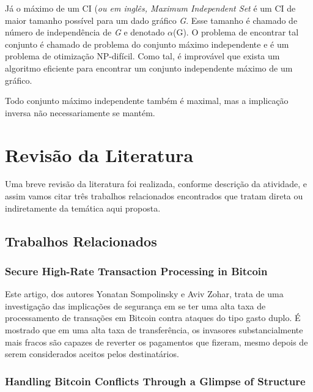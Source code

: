 \documentclass[conference]{IEEEtran}
\begin{document}
Já o máximo de um CI (\emph{ou  em inglês, Maximum Independent Set} é um CI de maior tamanho possível para um dado gráfico \emph{G}. Esse tamanho é chamado de número de independência de \emph{G} e denotado $\alpha$(G). O problema de encontrar tal conjunto é chamado de problema do conjunto máximo independente e é um problema de otimização NP-difícil. Como tal, é improvável que exista um algoritmo eficiente para encontrar um conjunto independente máximo de um gráfico.

Todo conjunto máximo independente também é maximal, mas a implicação inversa não necessariamente se mantém.













\section{Revisão da Literatura}
Uma breve revisão da literatura foi realizada, conforme descrição da atividade, e assim vamos citar três trabalhos relacionados encontrados que tratam direta ou indiretamente da temática aqui proposta.

\subsection{Trabalhos Relacionados}

\subsubsection{Secure High-Rate Transaction Processing
in Bitcoin}

Este artigo, dos autores Yonatan Sompolinsky e Aviv Zohar, trata de uma investigação das implicações de segurança em se ter uma alta taxa de processamento de transações em Bitcoin contra ataques do tipo gasto duplo. É mostrado que em uma alta
taxa de transferência, os invasores substancialmente mais fracos são capazes de reverter os pagamentos que fizeram, mesmo depois de serem considerados aceitos pelos destinatários. 




\subsubsection{Handling Bitcoin Conflicts Through a Glimpse of
Structure}
\end{document}
